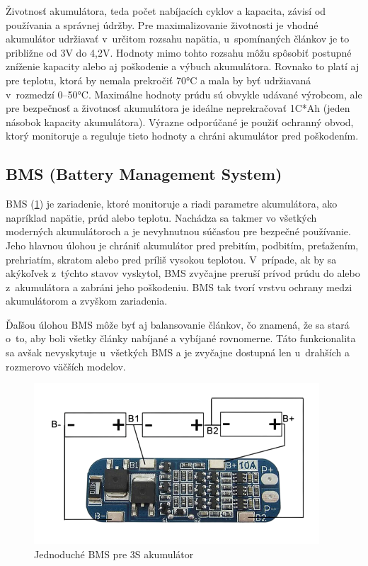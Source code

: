 Životnosť akumulátora, teda počet nabíjacích cyklov a kapacita, závisí od používania a správnej údržby.
Pre maximalizovanie životnosti je vhodné akumulátor udržiavať v~určitom rozsahu napätia, u~spomínaných článkov je to približne od 3V do 4,2V.
Hodnoty mimo tohto rozsahu môžu spôsobiť postupné zníženie kapacity alebo aj poškodenie a výbuch akumulátora.
Rovnako to platí aj pre teplotu, ktorá by nemala prekročiť 70°C a mala by byť udržiavaná v~rozmedzí 0--50°C.
Maximálne hodnoty prúdu sú obvykle udávané výrobcom, ale pre bezpečnosť a životnosť akumulátora je ideálne neprekračovať 1C*Ah (jeden násobok kapacity akumulátora).
Výrazne odporúčané je použiť ochranný obvod, ktorý monitoruje a reguluje tieto hodnoty a chráni akumulátor pred poškodením.\cite{BatterySpace}

\subsection{BMS (Battery Management System)}
BMS (\ref{fig:bms}) je zariadenie, ktoré monitoruje a riadi parametre akumulátora, ako napríklad napätie, prúd alebo teplotu.
Nachádza sa takmer vo všetkých moderných akumulátoroch a je nevyhnutnou súčasťou pre bezpečné používanie.
Jeho hlavnou úlohou je chrániť akumulátor pred prebitím, podbitím, preťažením, prehriatím, skratom alebo pred príliš vysokou teplotou.
V~prípade, ak by sa akýkoľvek z~týchto stavov vyskytol, BMS zvyčajne preruší prívod prúdu do alebo z~akumulátora a zabráni jeho poškodeniu.
BMS tak tvorí vrstvu ochrany medzi akumulátorom a zvyškom zariadenia.

Ďaľšou úlohou BMS môže byť aj balansovanie článkov, čo znamená, že sa stará o~to, aby boli všetky články nabíjané a vybíjané rovnomerne.
Táto funkcionalita sa avšak nevyskytuje u~všetkých BMS a je zvyčajne dostupná len u~drahších a rozmerovo väčších modelov.\cite{Bergveld}

\begin{figure}[h]
    \centering
    \includegraphics[height=6cm]{figures/bms.png}
    \caption{Jednoduché BMS pre 3S akumulátor\cite{CampusComponent}}\label{fig:bms}
\end{figure}

